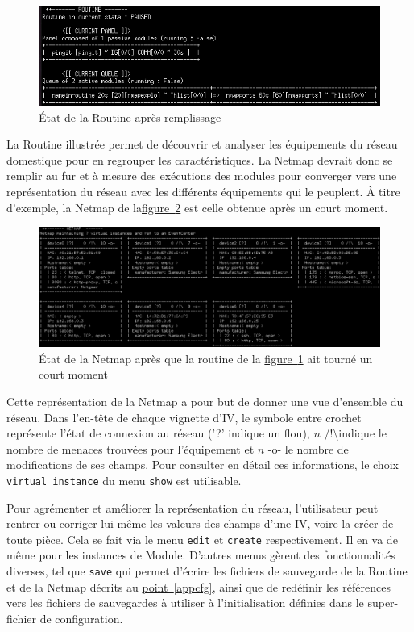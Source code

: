 \documentclass[]{article}
\newcommand{\wordlink}[2]{\hyperref[#1]{#2~\ref{#1}}}
\begin{document}
\begin{figure}[!ht]
\centering
     \includegraphics[width=0.7\linewidth]{vueroutine}
     \caption{État de la Routine après remplissage}
     \label{vueroutine}
\end{figure}

La Routine illustrée permet de découvrir et analyser les équipements du réseau domestique pour en regrouper les caractéristiques. La Netmap devrait donc se remplir au fur et à mesure des exécutions des modules pour converger vers une représentation du réseau avec les différents équipements qui le peuplent. À titre d'exemple, la Netmap de la\wordlink{vuenetmap}{figure} est celle obtenue après un court moment.


\begin{figure}[!ht]
\centering
     \includegraphics[width=\linewidth]{netmap}
     \caption{État de la Netmap après que la routine de la \wordlink{vueroutine}{figure} ait tourné un court moment}
     \label{vuenetmap}
\end{figure}

\par Cette représentation de la Netmap a pour but de donner une vue d'ensemble du réseau. Dans l'en-tête de chaque vignette d'IV, le symbole entre crochet représente l'état de connexion au réseau ('?' indique un flou), $n$ /!\textbackslash  indique le nombre de menaces trouvées pour l'équipement et $n$ -o- le nombre de modifications de ses champs. Pour consulter en détail ces informations, le choix \texttt{virtual instance} du menu \texttt{show} est utilisable.\\

\par Pour agrémenter et améliorer la représentation du réseau, l'utilisateur peut rentrer ou corriger lui-même les valeurs des champs d'une IV, voire la créer de toute pièce. Cela se fait via le menu \texttt{edit} et \texttt{create} respectivement. Il en va de même pour les instances de Module. D'autres menus gèrent des fonctionnalités diverses, tel que \texttt{save} qui permet d'écrire les fichiers de sauvegarde de la Routine et de la Netmap décrits au \wordlink{appcfg}{point}, ainsi que de redéfinir les références vers les fichiers de sauvegardes à utiliser à l'initialisation définies dans le super-fichier de configuration. 
\end{document}
